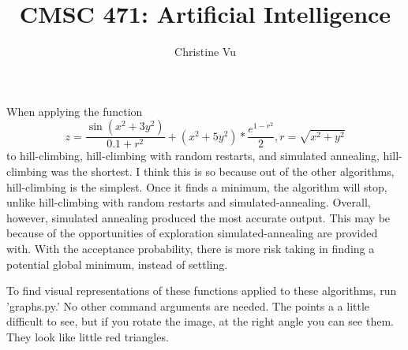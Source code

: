 \documentclass[a4paper]{article}
\title{CMSC 471: Artificial Intelligence}
\author{Christine Vu}
\begin{document}
\maketitle

\section{}
When applying the function
\[z = \frac{\sin(x^2 + 3y^2)}{0.1 + r^2} + (x^2 + 5y^2) * \frac{e^{1-r^2}}{2}, r = \sqrt{x^2 + y^2}  \]
to hill-climbing, hill-climbing with random restarts, and simulated annealing, hill-climbing was the shortest. I think this is so because out of the other algorithms, hill-climbing is the simplest. Once it finds a minimum, the algorithm will stop, unlike hill-climbing with random restarts and simulated-annealing. Overall, however, simulated annealing produced the most accurate output. This may be because of the opportunities of exploration simulated-annealing are provided with. With the acceptance probability, there is more risk taking in finding a potential global minimum, instead of settling. 

To find visual representations of these functions applied to these algorithms, run 'graphs.py.' No other command arguments are needed. The points a a little difficult to see, but if you rotate the image, at the right angle you can see them. They look like little red triangles. 
\end{document}
